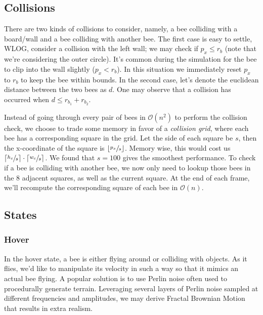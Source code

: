 \documentclass[a4paper,10pt]{article}
\begin{document}
\begin{multicols}{2}
    \subsection{Collisions}
    There are two kinds of collisions to consider, namely, a bee colliding with a board/wall
    and a bee colliding with another bee. The first case is easy to settle, WLOG, consider
    a collision with the left wall; we may check if $p_{x} \leq r_{b}$ (note that we're
    considering the outer circle). It's common during the simulation for the bee to clip into
    the wall slightly ($p_{x} < r_{b}$). In this situation we immediately reset $p_{x}$ to $r_{b}$
    to keep the bee within bounds. In the second case, let's denote the euclidean distance
    between the two bees as $d$. One may observe that a collision has occurred when
    $d \leq r_{b_{1}}+r_{b_{2}}$.

    Instead of going through every pair of bees in $\mathcal{O}(n^{2})$ to perform the collision
    check, we choose to trade some memory in favor of a \textit{collision grid}, where each
    bee has a corresponding square in the grid. Let the side of each square be $s$, then
    the x-coordinate of the square is $\lfloor \sfrac{p_{x}}{s} \rfloor$. Memory wise,
    this would cost us $\lceil \sfrac{h_{c}}{s} \rceil \cdot \lceil \sfrac{w_{c}}{s} \rceil$.
    We found that $s = 100$ gives the smoothest performance. To check if a bee is colliding
    with another bee, we now only need to lookup those bees in the $8$ adjacent squares, as
    well as the current square. At the end of each frame, we'll recompute the corresponding
    square of each bee in $\mathcal{O}(n)$.

    \subsection{States}
    \subsubsection{Hover}
    In the hover state, a bee is either flying around or colliding with objects.
    As it flies, we'd like to manipulate its velocity in such a way so that it
    mimics an actual bee flying. A popular solution is to use Perlin noise
    \cite{perlin2002improving} often used to procedurally generate terrain.
    Leveraging several layers of Perlin noise sampled at different frequencies
    and amplitudes, we may derive Fractal Brownian Motion that results in
    extra realism.


\end{multicols}
\end{document}
